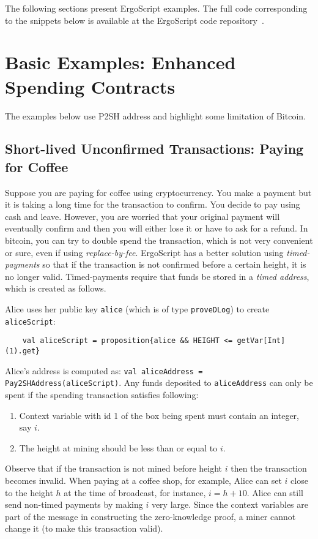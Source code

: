 \documentclass[11pt]{article}
\newcommand{\langname}{ErgoScript\xspace}
\begin{document}
The following sections present \langname examples. The full code corresponding to the snippets below is available at the \langname code repository~\cite{langrepo}. 
\section{Basic Examples: Enhanced Spending Contracts}

The examples below use P2SH address and highlight some limitation of Bitcoin. 

\subsection{Short-lived Unconfirmed Transactions: Paying for Coffee}

Suppose you are paying for coffee using cryptocurrency. You make a payment but it is taking a long time for the transaction to confirm. You decide to pay using cash and leave. However, you are worried that your original payment will eventually confirm and then you will either lose it or have to ask for a refund. In bitcoin, you can try to double spend the transaction, which is not very convenient or sure, even if using {\em replace-by-fee}. \langname has a better solution using {\em timed-payments} so that if the transaction is not confirmed before a certain height, it is no longer valid. Timed-payments require that funds be stored in a {\em timed address}, which is created as follows. 

Alice uses her public key \texttt{alice} (which is of type \texttt{proveDLog}) to create \texttt{aliceScript}:
\begin{verbatim}
	val aliceScript = proposition{alice && HEIGHT <= getVar[Int](1).get}
\end{verbatim}

Alice's address is computed as: \texttt{val aliceAddress = Pay2SHAddress(aliceScript)}. Any funds deposited to \texttt{aliceAddress} can only be spent if the spending transaction satisfies following:
\begin{enumerate}
	\item Context variable with id 1 of the box being spent must contain an integer, say $i$.
	\item The height at mining should be less than or equal to $i$. 
\end{enumerate}

Observe that if the transaction is not mined before height $i$ then the transaction becomes invalid. When paying at a coffee shop, for example, Alice can set $i$ close to the height $h$ at the time of broadcast, for instance, $i = h + 10$. 
Alice can still send non-timed payments by making $i$ very large. Since the context variables are part of the message in constructing the zero-knowledge proof, a miner cannot change it (to make this transaction valid). 
\end{document}
